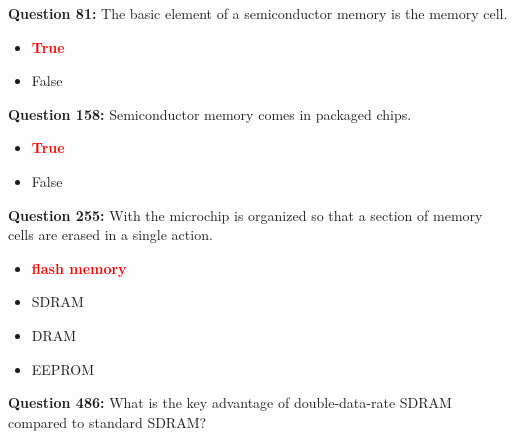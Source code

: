 \documentclass[12pt,a4paper]{article}
\begin{document}
\vspace{0.5cm}

\vspace{0.5cm}

\textbf{Question 81:} The basic element of a semiconductor memory is the memory cell.

\begin{itemize}
    \item[\textbf{A.}] \textcolor{red}{\textbf{True}}
    \item[\textbf{B.}] False
\end{itemize}

\vspace{0.5cm}

\vspace{0.5cm}

\textbf{Question 158:} Semiconductor memory comes in packaged chips.

\begin{itemize}
    \item[\textbf{A.}] \textcolor{red}{\textbf{True}}
    \item[\textbf{B.}] False
\end{itemize}

\vspace{0.5cm}

\vspace{0.5cm}

\textbf{Question 255:} With \underline{\hspace{1.5cm}} the microchip is organized so that a section of memory cells are erased in a single action.

\begin{itemize}
    \item[\textbf{A.}] \textcolor{red}{\textbf{flash memory}}
    \item[\textbf{B.}] SDRAM
    \item[\textbf{C.}] DRAM
    \item[\textbf{D.}] EEPROM
\end{itemize}

\vspace{0.5cm}

\vspace{0.5cm}

\vspace{0.5cm}

\vspace{0.5cm}

\textbf{Question 486:} What is the key advantage of double-data-rate SDRAM compared to standard SDRAM?
\end{document}
